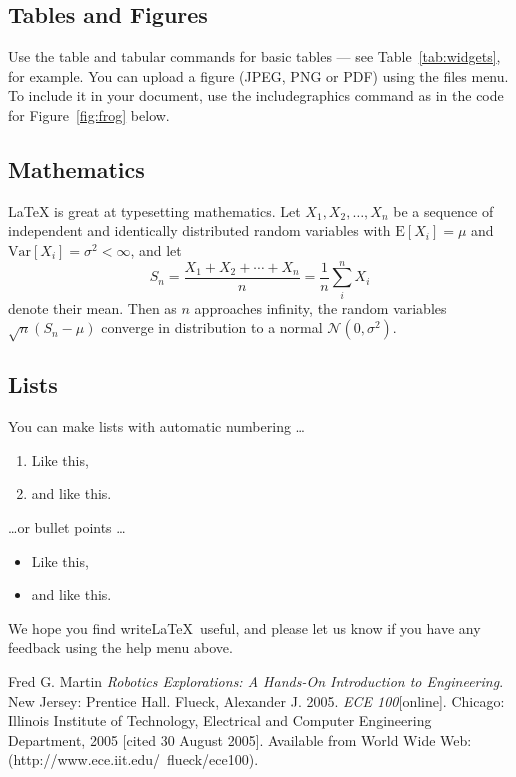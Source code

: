\subsection{Tables and Figures}

Use the table and tabular commands for basic tables --- see Table~\ref{tab:widgets}, for example. You can upload a figure (JPEG, PNG or PDF) using the files menu. To include it in your document, use the includegraphics command as in the code for Figure~\ref{fig:frog} below.


\subsection{Mathematics}

\LaTeX{} is great at typesetting mathematics. Let $X_1, X_2, \ldots, X_n$ be a sequence of independent and identically distributed random variables with $\text{E}[X_i] = \mu$ and $\text{Var}[X_i] = \sigma^2 < \infty$, and let
$$S_n = \frac{X_1 + X_2 + \cdots + X_n}{n}
      = \frac{1}{n}\sum_{i}^{n} X_i$$
denote their mean. Then as $n$ approaches infinity, the random variables $\sqrt{n}(S_n - \mu)$ converge in distribution to a normal $\mathcal{N}(0, \sigma^2)$.

\subsection{Lists}

You can make lists with automatic numbering \dots

\begin{enumerate}
\item Like this,
\item and like this.
\end{enumerate}
\dots or bullet points \dots
\begin{itemize}
\item Like this,
\item and like this.
\end{itemize}

We hope you find write\LaTeX\ useful, and please let us know if you have any feedback using the help menu above.

\begin{thebibliography}{9}
	 Fred G. Martin \emph{Robotics Explorations: A Hands-On Introduction to Engineering}. New Jersey: Prentice Hall.
	  Flueck, Alexander J. 2005. \emph{ECE 100}[online]. Chicago: Illinois Institute of Technology, Electrical and Computer Engineering Department, 2005 [cited 30
	August 2005]. Available from World Wide Web: (http://www.ece.iit.edu/~flueck/ece100).
\end{thebibliography}


